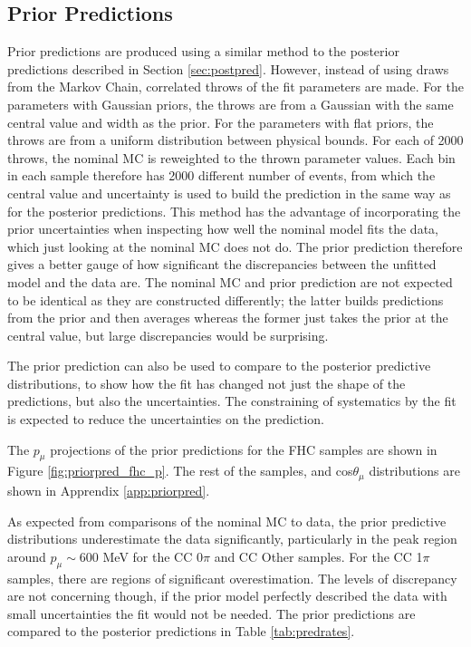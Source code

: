 \subsection{Prior Predictions}

Prior predictions are produced using a similar method to the posterior predictions described in Section \ref{sec:postpred}. However, instead of using draws from the Markov Chain, correlated throws of the fit parameters are made. For the parameters with Gaussian priors, the throws are from a Gaussian with the same central value and width as the prior. For the parameters with flat priors, the throws are from a uniform distribution between physical bounds. For each of 2000 throws, the nominal MC is reweighted to the thrown parameter values. Each bin in each sample therefore has 2000 different number of events, from which the central value and uncertainty is used to build the prediction in the same way as for the posterior predictions. This method has the advantage of incorporating the prior uncertainties when inspecting how well the nominal model fits the data, which just looking at the nominal MC does not do. The prior prediction therefore gives a better gauge of how significant the discrepancies between the unfitted model and the data are. The nominal MC and prior prediction are not expected to be identical as they are constructed differently; the latter builds predictions from the prior and then averages whereas the former just takes the prior at the central value, but large discrepancies would be surprising.

The prior prediction can also be used to compare to the posterior predictive distributions, to show how the fit has changed not just the shape of the predictions, but also the uncertainties. The constraining of systematics by the fit is expected to reduce the uncertainties on the prediction.

The $p_{\mu}$ projections of the prior predictions for the FHC samples are shown in Figure \ref{fig:priorpred_fhc_p}. The rest of the samples, and cos$\theta_{\mu}$ distributions are shown in Apprendix \ref{app:priorpred}.

As expected from comparisons of the nominal MC to data, the prior predictive distributions underestimate the data significantly, particularly in the peak region around $p_{\mu} \sim$600 MeV for the CC 0$\pi$ and CC Other samples. For the CC 1$\pi$ samples, there are regions of significant overestimation. The levels of discrepancy are not concerning though, if the prior model perfectly described the data with small uncertainties the fit would not be needed. The prior predictions are compared to the posterior predictions in Table \ref{tab:predrates}.

